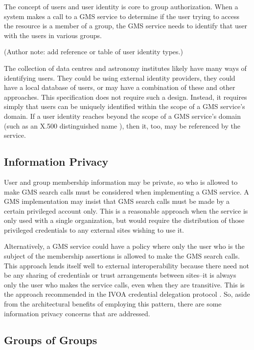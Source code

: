 \documentclass[11pt,a4paper]{ivoa}
\begin{document}
The concept of users and user identity is core to group authorization.  When a system makes a call to a GMS service to determine if the user trying to access the resource is a member of a group, the GMS service needs to identify that user with the users in various groups.

(Author note: add reference or table of user identity types.)

The collection of data centres and astronomy institutes likely have many ways of identifying users.  They could be using external identity providers, they could have a local database of users, or may have a combination of these and other approaches.  This specification does not require such a design.  Instead, it requires simply that users can be uniquely identified within the scope of a GMS service's domain.  If a user identity reaches beyond the scope of a GMS service's domain (such as an X.500 distinguished name \citep{std:RFC1779}), then it, too, may be referenced by the service.

\subsection{Information Privacy}

User and group membership information may be private, so who is allowed to make GMS search calls must be considered when implementing a GMS service.  A GMS implementation may insist that GMS search calls must be made by a certain privileged account only.  This is a reasonable approach when the service is only used with a single organization, but would require the distribution of those privileged credentials to any external sites wishing to use it.

Alternatively, a GMS service could have a policy where only the user who is the subject of the membership assertions is allowed to make the GMS search calls.  This approach lends itself well to external interoperability because there need not be any sharing of credentials or trust arrangements between sites--it is always only the user who makes the service calls, even when they are transitive.  This is the approach recommended in the  IVOA credential delegation protocol \citep{std:CDP}.  So, aside from the architectural benefits of employing this pattern, there are some information privacy concerns that are addressed.

\subsection{Groups of Groups}
\end{document}
